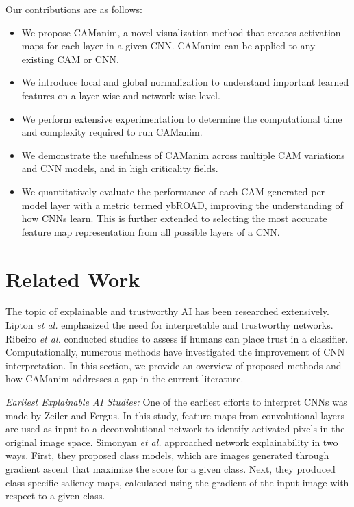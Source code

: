 \documentclass[10pt, conference, compsocconf]{IEEEtran}
\begin{document}
Our contributions are as follows:

\begin{itemize}
    \item We propose CAManim, a novel visualization method that creates activation maps for each layer in a given CNN. CAManim can be applied to any existing CAM or CNN.

    \item We introduce local and global normalization to understand important learned features on a layer-wise and network-wise level.

    \item We perform extensive experimentation to determine the computational time and complexity required to run CAManim.

    \item We demonstrate the usefulness of CAManim across multiple CAM variations and CNN models, and in high criticality fields.

    \item We quantitatively evaluate the performance of each CAM generated per model layer with a metric termed ybROAD, improving the understanding of how CNNs learn. This is further extended to selecting the most accurate feature map representation from all possible layers of a CNN.

   
\end{itemize}

\section{Related Work}

The topic of explainable and trustworthy AI has been researched extensively. Lipton \textit{et al.} \cite{lipton2018mythos} emphasized the need for interpretable and trustworthy networks. Ribeiro \textit{et al.} \cite{ribeiro2016should} conducted studies to assess if humans can place trust in a classifier. Computationally, numerous methods have investigated the improvement of CNN interpretation. In this section, we provide an overview of proposed methods and how CAManim addresses a gap in the current literature.

\textit{Earliest Explainable AI Studies:} One of the earliest efforts to interpret CNNs was made by Zeiler and Fergus\cite{zeiler2014visualizing}. In this study, feature maps from convolutional layers are used as input to a deconvolutional network to identify activated pixels in the original image space. Simonyan \textit{et al.} \cite{simonyan2013deep} approached network explainability in two ways. First, they proposed class models, which are images generated through gradient ascent that maximize the score for a given class. Next, they produced class-specific saliency maps, calculated using the gradient of the input image with respect to a given class.
\end{document}
